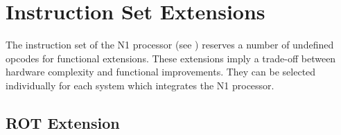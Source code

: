 
\section{Instruction Set Extensions}
\label{extensions}

The instruction set of the N1 processor (see ) reserves a number
of undefined \glspl{opcode} for functional extensions.
These extensions imply a trade-off between hardware complexity and functional 
improvements.
They can be selected individually for each system which integrates the N1 processor.    

\subsection{ROT Extension}
\label{extensions:rot}

